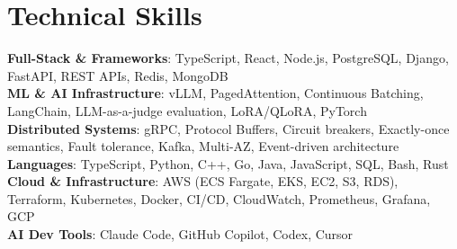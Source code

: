 \documentclass[letterpaper,11pt]{article}
\begin{document}
\section{Technical Skills}
\vspace{-7pt}
\begin{itemize}
[leftmargin=0.15in, label={}]\small{\item{
        \textbf{Full-Stack \& Frameworks}{: TypeScript, React, Node.js, PostgreSQL, Django, FastAPI, REST APIs, Redis, MongoDB} \\
        \textbf{ML \& AI Infrastructure}{: vLLM, PagedAttention, Continuous Batching, LangChain, LLM-as-a-judge evaluation, LoRA/QLoRA, PyTorch} \\
        \textbf{Distributed Systems}{: gRPC, Protocol Buffers, Circuit breakers, Exactly-once semantics, Fault tolerance, Kafka, Multi-AZ, Event-driven architecture} \\
        \textbf{Languages}{: TypeScript, Python, C++, Go, Java, JavaScript, SQL, Bash, Rust} \\
        \textbf{Cloud \& Infrastructure}{: AWS (ECS Fargate, EKS, EC2, S3, RDS), Terraform, Kubernetes, Docker, CI/CD, CloudWatch, Prometheus, Grafana, GCP} \\
        \textbf{AI Dev Tools}{: Claude Code, GitHub Copilot, Codex, Cursor} \\
}}
\end{itemize}
\end{document}
